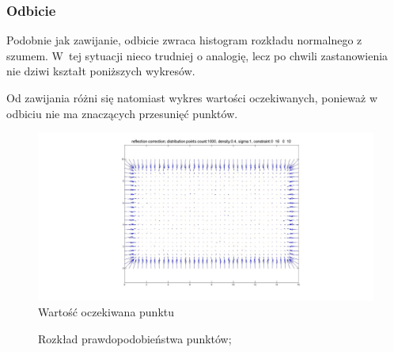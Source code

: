 \documentclass{mini}
\begin{document}
\subsubsection*{Odbicie}
Podobnie jak zawijanie, odbicie zwraca histogram rozkładu normalnego z szumem. W~tej sytuacji nieco trudniej o analogię, lecz po chwili zastanowienia nie dziwi kształt poniższych wykresów.

Od zawijania różni się natomiast wykres wartości oczekiwanych, ponieważ w odbiciu nie ma znaczących przesunięć punktów.

\begin{figure}[H]
\centering
\includegraphics[width=\textwidth]{reflection2dprzesuniecie}
\caption{Wartość oczekiwana punktu}
\end{figure}

\begin{figure}[H]
\centering
{}
\quad
{}
\caption{Rozkład prawdopodobieństwa punktów;}
\end{figure}
\end{document}
